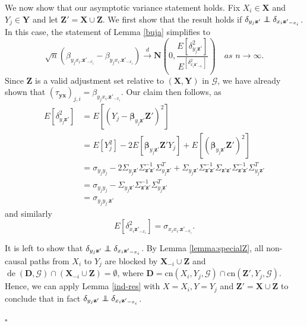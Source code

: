 \documentclass[11pt,a4paper]{article}
\theoremstyle{definition}
\theoremstyle{remark}
\newenvironment{proofof}[1][]{\begin{trivlist}
\item[\hskip \labelsep {\textit{Proof of #1.}}]}{\hfill{}$\square$\end{trivlist}}
\newcommand\ci{\protect\mathpalette{\protect\independenT}{\perp}}
\def\independenT#1#2{\mathrel{\rlap{$#1#2$}\mkern2mu{#1#2}}}
\DeclareMathOperator{\de}{de}
\newcommand{\g}[1][G]{\mathcal{#1}}
\begin{document}
\begin{proofof}[Proposition~\ref{avarDAG}]
	 We now show that our asymptotic variance statement holds. Fix $X_i \in \mathbf{X}$ and $Y_j \in \mathbf{Y}$ and let $\mathbf{Z'}= \mathbf{X} \cup \mathbf{Z}$. 
	We first show that the result holds if   $\delta_{y_j\mathbf{z'}} \ci \delta_{x_i\mathbf{z'}_{-x_i}}$. In this case, the statement of Lemma \ref{buja} simplifies to
	\[
	\sqrt{n}(\hat{\beta}_{y_jx_i.\mathbf{z'}_{-x_i}} - \beta_{y_jx_i.\mathbf{z'}_{-x_i}}) \xrightarrow{d} 
	\mathbf{N}\left(0,\frac{E[\delta^2_{y_j\mathbf{z'}}]}{E^[\delta^2_{x_i\mathbf{z'}_{-x_i}}]}\right) \quad \textit{as } n \rightarrow \infty.
	\] 
	Since $\mathbf{Z}$ is a valid adjustment set relative to $(\mathbf{X},\mathbf{Y})$ in $\g$, we have already shown that $(\tau_{\mathbf{yx}})_{j,i} =\beta_{y_jx_i.\mathbf{z'}_{-x_i}}$. Our claim then follows, as 
	\begin{align}
	E[\delta^2_{y_j\mathbf{z'}}] &= E[(Y_j - \boldsymbol{\beta}_{y_j\mathbf{z'}}\mathbf{Z'})^2] \nonumber \\
	&= E[Y_j^2] - 2 E[ \boldsymbol{\beta}_{y_j\mathbf{z'}}\mathbf{Z'} Y_j] + E[(\boldsymbol{\beta}_{y_j\mathbf{z'}}\mathbf{Z'})^2] \nonumber \\
	&= \sigma_{y_jy_j} - 2 \Sigma_{y_j\mathbf{z'}} \Sigma^{-1}_{\mathbf{z'z'}} \Sigma^T_{y_j\mathbf{z'}} + \Sigma_{y_j\mathbf{z'}} \Sigma^{-1}_{\mathbf{z'z'}}  \Sigma_{\mathbf{z'z'}} \Sigma^{-1}_{\mathbf{z'z'}} \Sigma^T_{y_j\mathbf{z'}} \nonumber \\
	&= \sigma_{y_jy_j} - \Sigma_{y_j\mathbf{z'}} \Sigma^{-1}_{\mathbf{z'z'}} \Sigma^T_{y_j\mathbf{z'}} \nonumber \\
	&= \sigma_{y_jy_j.\mathbf{z'}} \nonumber
	\end{align}
	and similarly
	\[
	E[\delta^2_{x_i\mathbf{z'}_{-x_i}}] = \sigma_{x_ix_i.\mathbf{z'}_{-x_i}}.
	\]
	
	It is left to show that $\delta_{y_j\mathbf{z'}} \ci \delta_{x_i\mathbf{z'}_{-x_i}}$. By Lemma \ref{lemma:specialZ}, all non-causal paths from $X_i$ to $Y_j$ are blocked by $ \mathbf{X}_{-i} \cup \mathbf{Z}$ and $\de(\mathbf{D},\g) \cap (\mathbf{X}_{-i} \cup \mathbf{Z}) =\emptyset$, where $\mathbf{D}=\text{cn}(X_i,Y_j,\g) \cap \text{cn}(\mathbf{Z'},Y_j,\g)$. 
	Hence, we can apply Lemma \ref{ind-res} with  $X=X_i,Y=Y_j$ and $\mathbf{Z'}= \mathbf{X} \cup \mathbf{Z}$ to conclude that in fact $\delta_{y_j\mathbf{z'}} \ci \delta_{x_i\mathbf{z'}_{-x_i}}$. 
	

\end{proofof}
\end{document}
